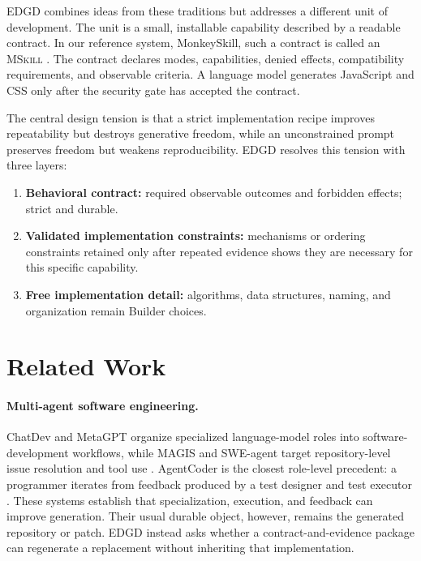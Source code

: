 \documentclass[10pt]{article}
\newcommand{\method}{\textsc{EDGD}\xspace}
\newcommand{\mskill}{\textsc{MSkill}\xspace}
\begin{document}
\method combines ideas from these traditions but addresses a different unit of development. The unit is a small, installable capability described by a readable contract. In our reference system, MonkeySkill, such a contract is called an \mskill{} \citep{monkeyskill2026}. The contract declares modes, capabilities, denied effects, compatibility requirements, and observable criteria. A language model generates JavaScript and CSS only after the security gate has accepted the contract.

The central design tension is that a strict implementation recipe improves repeatability but destroys generative freedom, while an unconstrained prompt preserves freedom but weakens reproducibility. \method resolves this tension with three layers:

\begin{enumerate}[leftmargin=*]
  \item \textbf{Behavioral contract:} required observable outcomes and forbidden effects; strict and durable.
  \item \textbf{Validated implementation constraints:} mechanisms or ordering constraints retained only after repeated evidence shows they are necessary for this specific capability.
  \item \textbf{Free implementation detail:} algorithms, data structures, naming, and organization remain Builder choices.
\end{enumerate}

\section{Related Work}

\paragraph{Multi-agent software engineering.}
ChatDev and MetaGPT organize specialized language-model roles into software-development
workflows, while MAGIS and SWE-agent target repository-level issue resolution and tool use
\citep{qian2023chatdev,hong2023metagpt,tao2024magis,yang2024sweagent}. AgentCoder is the
closest role-level precedent: a programmer iterates from feedback produced by a test designer
and test executor \citep{huang2023agentcoder}. These systems establish that specialization,
execution, and feedback can improve generation. Their usual durable object, however, remains
the generated repository or patch. \method instead asks whether a contract-and-evidence
package can regenerate a replacement without inheriting that implementation.
\end{document}
